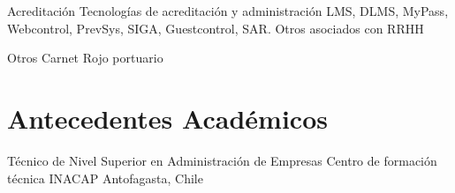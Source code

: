 \documentclass[draft,color,12pt,letterpaper,sans]{moderncv}
\begin{document}
\cventry {}
{Acreditación}
{Tecnologías de acreditación y administración}
{}
{\newline LMS, DLMS, MyPass, Webcontrol, PrevSys, SIGA, Guestcontrol, SAR. \newline Otros asociados con RRHH}
{}

\cventry {}
{Otros}
{}
{}
{\newline Carnet Rojo portuario}
{}

\section{Antecedentes Académicos}
{Técnico de Nivel Superior en Administración de Empresas}
{Centro de formación técnica INACAP}
{Antofagasta, Chile}
{}
{}
\end{document}
